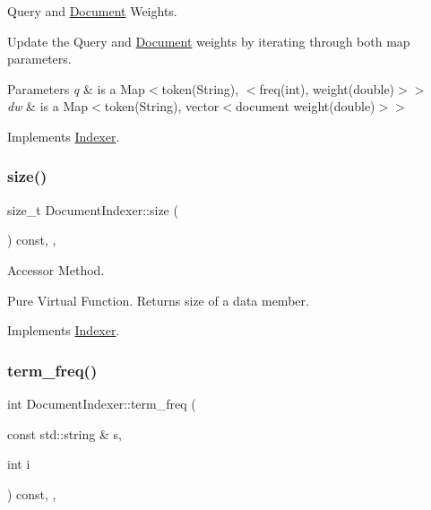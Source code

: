 Query and \hyperlink{class_document}{Document} Weights. 

Update the Query and \hyperlink{class_document}{Document} weights by iterating through both map parameters.


\begin{DoxyParams}{Parameters}
{\em q} & is a Map$<$token(\+String), $<$freq(int), weight(double)$>$$>$ \\
\hline
{\em dw} & is a Map$<$token(\+String), vector$<$document weight(double)$>$$>$ \\
\hline
\end{DoxyParams}


Implements \hyperlink{class_indexer_a74819336b6d9883483c09349ebdf43b8}{Indexer}.

\mbox{\label{class_document_indexer_a0c5ab06e1506acc9bbc950e5c563e278}} 
\subsubsection{\texorpdfstring{size()}{size()}}
{\footnotesize\ttfamily size\+\_\+t Document\+Indexer\+::size (\begin{DoxyParamCaption}{ }\end{DoxyParamCaption}) const\hspace{0.3cm}{\ttfamily [inline]}, {\ttfamily [override]}, {\ttfamily [virtual]}}



Accessor Method. 

Pure Virtual Function. Returns size of a data member. 

Implements \hyperlink{class_indexer_ab8b3e17bbf16d54e1e773a1630abb138}{Indexer}.

\mbox{\label{class_document_indexer_aba9275a0648629cab3772e75519938e8}} 
\subsubsection{\texorpdfstring{term\+\_\+freq()}{term\_freq()}}
{\footnotesize\ttfamily int Document\+Indexer\+::term\+\_\+freq (\begin{DoxyParamCaption}\item[{const std\+::string \&}]{s,  }\item[{int}]{i }\end{DoxyParamCaption}) const\hspace{0.3cm}{\ttfamily [override]}, {\ttfamily [private]}, {\ttfamily [virtual]}}



